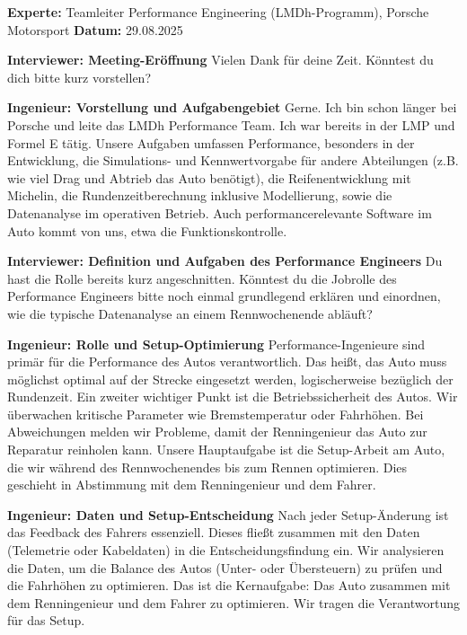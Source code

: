 \label{transkript-meeting1}

\textbf{Experte:} Teamleiter Performance Engineering (LMDh-Programm), Porsche Motorsport
\textbf{Datum:} 29.08.2025

\linenumbers

\textbf{Interviewer: Meeting-Eröffnung}
Vielen Dank für deine Zeit. Könntest du dich bitte kurz vorstellen?

\textbf{Ingenieur: Vorstellung und Aufgabengebiet}
Gerne. Ich bin schon länger bei Porsche und leite das LMDh Performance Team. Ich war bereits in der LMP und Formel E tätig. Unsere Aufgaben umfassen Performance, besonders in der Entwicklung, die Simulations- und Kennwertvorgabe für andere Abteilungen (z.B. wie viel Drag und Abtrieb das Auto benötigt), die Reifenentwicklung mit Michelin, die Rundenzeitberechnung inklusive Modellierung, sowie die Datenanalyse im operativen Betrieb. Auch performancerelevante Software im Auto kommt von uns, etwa die Funktionskontrolle.

\textbf{Interviewer: Definition und Aufgaben des Performance Engineers}
Du hast die Rolle bereits kurz angeschnitten. Könntest du die Jobrolle des Performance Engineers bitte noch einmal grundlegend erklären und einordnen, wie die typische Datenanalyse an einem Rennwochenende abläuft?

\textbf{Ingenieur: Rolle und Setup-Optimierung}
Performance-Ingenieure sind primär für die Performance des Autos verantwortlich. Das heißt, das Auto muss möglichst optimal auf der Strecke eingesetzt werden, logischerweise bezüglich der Rundenzeit. Ein zweiter wichtiger Punkt ist die Betriebssicherheit des Autos. Wir überwachen kritische Parameter wie Bremstemperatur oder Fahrhöhen. Bei Abweichungen melden wir Probleme, damit der Renningenieur das Auto zur Reparatur reinholen kann. Unsere Hauptaufgabe ist die Setup-Arbeit am Auto, die wir während des Rennwochenendes bis zum Rennen optimieren. Dies geschieht in Abstimmung mit dem Renningenieur und dem Fahrer.

\textbf{Ingenieur: Daten und Setup-Entscheidung}
Nach jeder Setup-Änderung ist das Feedback des Fahrers essenziell. Dieses fließt zusammen mit den Daten (Telemetrie oder Kabeldaten) in die Entscheidungsfindung ein. Wir analysieren die Daten, um die Balance des Autos (Unter- oder Übersteuern) zu prüfen und die Fahrhöhen zu optimieren. Das ist die Kernaufgabe: Das Auto zusammen mit dem Renningenieur und dem Fahrer zu optimieren. Wir tragen die Verantwortung für das Setup.

